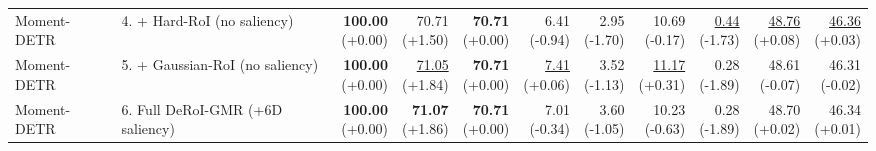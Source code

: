 \documentclass{article}
\begin{document}
{\begin{tabular}{llrrrrrrrrr}
Moment-DETR & 4. + Hard-RoI (no saliency) & \shortstack{\textbf{100.00} \\ {\scriptsize (+0.00)}} & \shortstack{70.71 \\ {\scriptsize (+1.50)}} & \shortstack{\textbf{70.71} \\ {\scriptsize (+0.00)}} & \shortstack{6.41 \\ {\scriptsize (-0.94)}} & \shortstack{2.95 \\ {\scriptsize (-1.70)}} & \shortstack{10.69 \\ {\scriptsize (-0.17)}} & \shortstack{\underline{0.44} \\ {\scriptsize (-1.73)}} & \shortstack{\underline{48.76} \\ {\scriptsize (+0.08)}} & \shortstack{\underline{46.36} \\ {\scriptsize (+0.03)}} \\
Moment-DETR & 5. + Gaussian-RoI (no saliency) & \shortstack{\textbf{100.00} \\ {\scriptsize (+0.00)}} & \shortstack{\underline{71.05} \\ {\scriptsize (+1.84)}} & \shortstack{\textbf{70.71} \\ {\scriptsize (+0.00)}} & \shortstack{\underline{7.41} \\ {\scriptsize (+0.06)}} & \shortstack{3.52 \\ {\scriptsize (-1.13)}} & \shortstack{\underline{11.17} \\ {\scriptsize (+0.31)}} & \shortstack{0.28 \\ {\scriptsize (-1.89)}} & \shortstack{48.61 \\ {\scriptsize (-0.07)}} & \shortstack{46.31 \\ {\scriptsize (-0.02)}} \\
Moment-DETR & 6. Full DeRoI-GMR (+6D saliency) & \shortstack{\textbf{100.00} \\ {\scriptsize (+0.00)}} & \shortstack{\textbf{71.07} \\ {\scriptsize (+1.86)}} & \shortstack{\textbf{70.71} \\ {\scriptsize (+0.00)}} & \shortstack{7.01 \\ {\scriptsize (-0.34)}} & \shortstack{3.60 \\ {\scriptsize (-1.05)}} & \shortstack{10.23 \\ {\scriptsize (-0.63)}} & \shortstack{0.28 \\ {\scriptsize (-1.89)}} & \shortstack{48.70 \\ {\scriptsize (+0.02)}} & \shortstack{46.34 \\ {\scriptsize (+0.01)}} \\

\end{tabular}}
\end{document}
